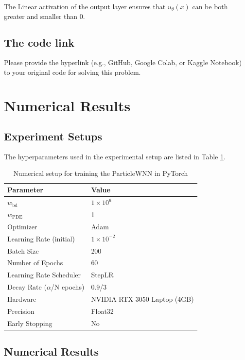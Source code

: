 The Linear activation of the output layer ensures that $u_\theta(x)$ can be both greater and smaller than 0.


\subsection{The code link}
{\color{blue}Please provide the hyperlink (e.g., GitHub, Google Colab, or Kaggle Notebook) to your original code for solving this problem.} 
%


\newpage
\section{Numerical Results}
%
\subsection{Experiment Setups}
%

The hyperparameters used in the experimental setup are listed in Table \ref{tab:training_setup_B}. 


\begin{table}[H]
	\centering
	\caption{Numerical setup for training the ParticleWNN in PyTorch}
	\label{tab:training_setup_B}
	\begin{tabular}{ll}
		\hline
		\textbf{Parameter} & \textbf{Value} \\
		\hline
		$w_\mathrm{bd}$     & $1\times10^6$ \\
		$w_\mathrm{PDE}$    & 1 \\
		Optimizer           & Adam \\
		Learning Rate (initial)       & $1 \times 10^{-2}$ \\
		Batch Size          & 200 \\
		Number of Epochs    & 60 \\
		Learning Rate Scheduler & StepLR \\
		Decay Rate ($\alpha$/N epochs) &  0.9/3\\
		Hardware            & NVIDIA RTX 3050 Laptop (4GB) \\
		Precision           & Float32 \\
		Early Stopping      & No \\
		\hline
	\end{tabular}
\end{table}

\subsection{Numerical Results}

